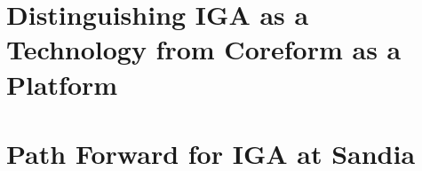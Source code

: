 \documentclass[12pt,report,justified]{SANDreport}
\begin{document}
\section{Distinguishing IGA as a Technology from Coreform as a Platform}

% 
% 

\section{Path Forward for IGA at Sandia}
\end{document}
